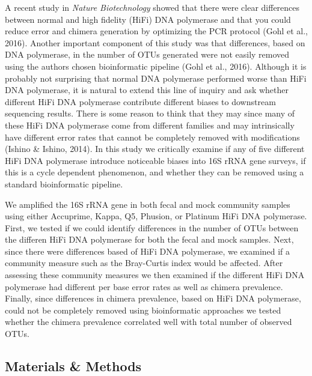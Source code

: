 \documentclass[12pt,]{article}
\begin{document}
A recent study in \emph{Nature Biotechnology} showed that there were
clear differences between normal and high fidelity (HiFi) DNA polymerase
and that you could reduce error and chimera generation by optimizing the
PCR protocol (Gohl et al., 2016). Another important component of this
study was that differences, based on DNA polymerase, in the number of
OTUs generated were not easily removed using the authors chosen
bioinformatic pipeline (Gohl et al., 2016). Although it is probably not
surprising that normal DNA polymerase performed worse than HiFi DNA
polymerase, it is natural to extend this line of inquiry and ask whether
different HiFi DNA polymerase contribute different biases to downstream
sequencing results. There is some reason to think that they may since
many of these HiFi DNA polymerase come from different families and may
intrinsically have different error rates that cannot be completely
removed with modifications (Ishino \& Ishino, 2014). In this study we
critically examine if any of five different HiFi DNA polymerase
introduce noticeable biases into 16S rRNA gene surveys, if this is a
cycle dependent phenomenon, and whether they can be removed using a
standard bioinformatic pipeline.

We amplified the 16S rRNA gene in both fecal and mock community samples
using either Accuprime, Kappa, Q5, Phusion, or Platinum HiFi DNA
polymerase. First, we tested if we could identify differences in the
number of OTUs between the differen HiFi DNA polymerase for both the
fecal and mock samples. Next, since there were differences based of HiFi
DNA polymerase, we examined if a community measure such as the
Bray-Curtis index would be affected. After assessing these community
measures we then examined if the different HiFi DNA polymerase had
different per base error rates as well as chimera prevalence. Finally,
since differences in chimera prevalence, based on HiFi DNA polymerase,
could not be completely removed using bioinformatic approaches we tested
whether the chimera prevalence correlated well with total number of
observed OTUs.

\newpage

\subsection{Materials \& Methods}\label{materials-methods}
\end{document}
